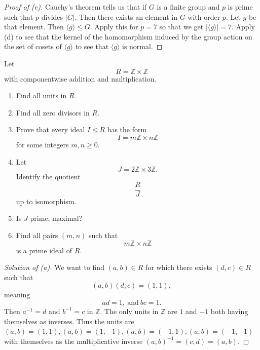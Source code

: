 \begin{proof}[Proof of (e)]
    Cauchy's theorem tells us that if 
    $G$ is a finite group and $p$ is prime 
    such that $p$ divides $|G|$. Then 
    there exists an element in $G$ with 
    order $p$. Let $g$ be that element. Then
    $\langle g \rangle \leq G$. Apply this for 
    $p = 7$ so that we get 
    $|\langle g \rangle| = 7$. Apply (d) 
    to see that the kernel of the homomorphism 
    induced by the group action on the set of 
    cosets of $\langle g \rangle$ to see that 
    $\langle g \rangle$ is normal. 
\end{proof}

\begin{prob}
    Let 
    \[
        R = \mathbb Z \times \mathbb Z
    \]
    with componentwise addition and multiplication. 
    \begin{enumerate}[label=\alph*)]
        \item Find all units in $R$. 
        \item Find all zero divisors in $R$. 
        \item Prove that every ideal $I \trianglelefteq R$ 
            has the form 
            \[
                I = m\mathbb Z \times n \mathbb Z
            \]   
            for some integers $m,n \geq 0$. 
        \item Let 
            \[
                J = 2\mathbb Z \times 3 \mathbb Z.
            \]
            Identify the quotient 
            \[
                \frac{R}{J}
            \]
            up to isomorphism. 
        \item Is $J$ prime, maximal? 
        \item Find all pairs $(m,n)$ such that 
            \[
                m\mathbb Z \times n \mathbb Z
            \]
            is a prime ideal of $R$.
    \end{enumerate}
\end{prob}
\begin{proof}[Solution of (a)]
    We want to find $(a,b) \in R$ for which there 
    exists $(d,c) \in R$ such that 
    \[
        (a,b)(d,c) = (1,1),
    \]
    meaning 
    \[
        ad = 1, \ \text{and} \ bc = 1. 
    \]
    Then $a^{-1} = d$ and $b^{-1} = c$ in 
    $\mathbb Z$. The only units in 
    $\mathbb Z$ are $1$ and $-1$ both having 
    themselves as inverses. Thus 
    the units are $(a,b) = (1,1), (a,b) = (1,-1), 
    (a,b) = (-1, 1), (a,b) = (-1,-1)$ with 
    themselves as the multiplicative inverse 
    $(a,b)^{-1} = (c,d) = (a,b)$. 
\end{proof}
